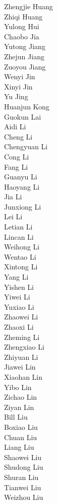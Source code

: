Zhengjie Huang\\
Zhiqi Huang\\
Yulong Hui\\
Chaobo Jia\\
Yutong Jiang\\
Zhejun Jiang\\
Zuoyou Jiang\\
Wenyi Jin\\
Xinyi Jin\\
Yu Jing\\
Huanjun Kong\\
Guokun Lai\\
Aidi Li\\
Cheng Li\\
Chengyuan Li\\
Cong Li\\
Fang Li\\
Guanyu Li\\
Haoyang Li\\
Jia Li\\
Junxiong Li\\
Lei Li\\
Letian Li\\
Lincan Li\\
Weihong Li\\
Wentao Li\\
Xintong Li\\
Yang Li\\
Yishen Li\\
Yiwei Li\\
Yuxiao Li\\
Zhaowei Li\\
Zhaoxi Li\\
Zheming Li\\
Zhengxiao Li\\
Zhiyuan Li\\
Jiawei Lin\\
Xiaohan Lin\\
Yibo Lin\\
Zichao Lin\\
Ziyan Lin\\
Bill Liu\\
Boxiao Liu\\
Chuan Liu\\
Liang Liu\\
Shaowei Liu\\
Shudong Liu\\
Shuran Liu\\
Tianwei Liu\\
Weizhou Liu\\
